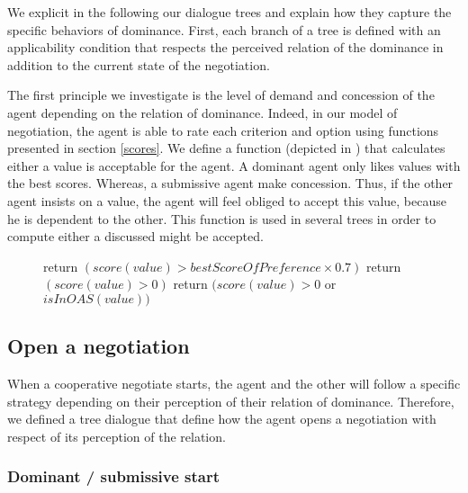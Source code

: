 \documentclass{llncs}
\begin{document}
\par We explicit in the following our dialogue trees and explain how they capture the specific behaviors of dominance. First, each branch of a tree  is defined with an applicability condition that respects the perceived relation of the dominance in addition to the current state of the negotiation. 

\par The first principle we investigate is the level of demand and concession of the agent depending on the relation of dominance. Indeed, in our model of negotiation, the agent is able to rate each criterion and option using functions presented in section \ref{scores}. We define a function (depicted in ) that calculates either a value is acceptable for the agent. A dominant agent only likes values with the best scores. Whereas, a submissive agent make concession. Thus, if the other agent insists on a value, the agent will feel obliged to accept this value, because he is dependent to the other. This function is used in several trees in order to compute either a discussed might be accepted.

 	\begin{figure}[]
 		\begin{algorithmic}[1]\small
 			
 			\State return $(score(value)> bestScoreOfPreference \times 0.7)$
 			\EndIf
 			\State return $(score(value)> 0)$
 			\EndIf
 			\State return $(score(value)> 0$  or $isInOAS(value))$
 			\EndIf
 			\EndFunction
 		\end{algorithmic}
 		\vskip 8pt
 	\end{figure} 
\subsection{Open a negotiation}
When a cooperative negotiate starts, the agent and the other will follow a specific strategy depending on their perception of their relation of dominance. Therefore, we defined a tree dialogue that define how the agent opens a negotiation with respect of its perception of the relation.
\subsubsection{Dominant / submissive start}
\end{document}
